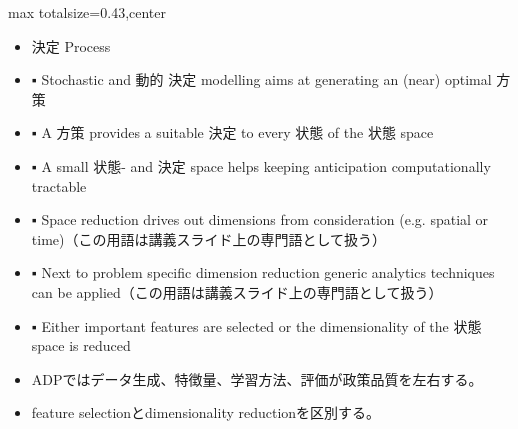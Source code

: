 \clearpage
{}
\begin{minipage}[t]{0.405\textwidth}
\begin{adjustbox}{max totalsize={\textwidth}{0.43\textheight},center}
\begin{minipage}{\textwidth}\scriptsize
{}\begin{itemize}
\item 決定 Process
\item ▪ Stochastic and 動的 決定 modelling aims at generating an (near) optimal 方策
\item ▪ A 方策 provides a suitable 決定 to every 状態 of the 状態 space
\item ▪ A small 状態- and 決定 space helps keeping anticipation computationally tractable
\item ▪ Space reduction drives out dimensions from consideration (e.g. spatial or time)（この用語は講義スライド上の専門語として扱う）
\item ▪ Next to problem specific dimension reduction generic analytics techniques can be applied（この用語は講義スライド上の専門語として扱う）
\item ▪ Either important features are selected or the dimensionality of the 状態 space is reduced
\end{itemize}\begin{itemize}
\item ADPではデータ生成、特徴量、学習方法、評価が政策品質を左右する。
\item feature selectionとdimensionality reductionを区別する。
\end{itemize}
\end{minipage}
\end{adjustbox}
\end{minipage}\hfill

